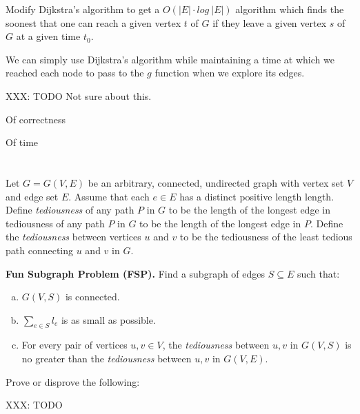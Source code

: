 \documentclass{amsart}
\theoremstyle{definition}
\theoremstyle{remark}
\numberwithin{equation}{section}
\begin{document}
Modify Dijkstra’s algorithm to get a $O(|E|\cdot log\ |E|)$ algorithm which
finds the soonest that one can reach a given vertex $t$ of $G$ if they
leave a given vertex $s$ of $G$ at a given time $t_0$.

\claimstar We can simply use Dijkstra's algorithm while maintaining a time
at which we reached each node to pass to the $g$ function when we
explore its edges.

XXX: TODO
\algstar Not sure about this.

\proof Of correctness

\proof Of time


\section{} Let $G = G(V,E)$ be an arbitrary, connected, undirected graph
with vertex set $V$ and edge set $E$. Assume that each $e \in E$ has a
distinct positive length length. Define \textit{tediousness} of any path
$P$ in $G$ to be the length of the longest edge in tediousness of any
path $P$ in $G$ to be the length of the longest edge in $P$. Define the
\textit{tediousness} between vertices $u$ and $v$ to be the tediousness
of the least tedious path connecting $u$ and $v$ in $G$.

\textbf{Fun Subgraph Problem (FSP).} Find a subgraph of edges $S \subseteq E$ such that:

\begin{enumerate}[(a)]
  \item $G(V,S)$ is connected.
  \item $\sum_{e \in S} l_e$ is as small as possible.
  \item For every pair of vertices $u,v \in V$, the \textit{tediousness} between $u,v$ in $G(V,S)$ 
    is no greater than the \textit{tediousness} between $u,v$ in $G(V,E)$.
\end{enumerate}

Prove or disprove the following:

XXX: TODO
\subsection{}

\subsection{}

\subsection{}
\end{document}
